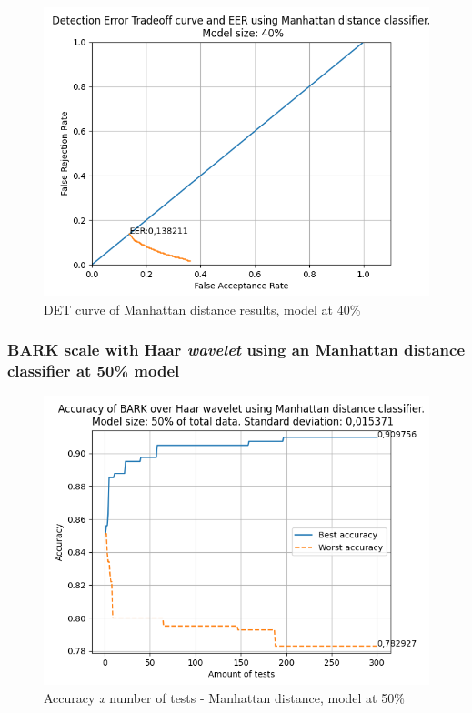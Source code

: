 			\begin{figure}[H]
				\centering
				\includegraphics[scale=.6]{images/results/det/DET_for_classifier_Manhattan_40}
				\caption{DET curve of Manhattan distance results, model at 40\%}
				\label{fig:detforclassifiermanhattan40}
			\end{figure}
		
			
		
		\subsubsection{BARK scale with Haar \textit{wavelet} using an Manhattan distance classifier at 50\% model}
			
			\begin{figure}[H]
				\centering
				\includegraphics[scale=.6]{images/results/confusionMatrices/classifier_Manhattan_50.png}
				\caption{Accuracy \textit{x} number of tests - Manhattan distance, model at 50\%}
				\label{fig:classifiermanhattan50}
			\end{figure}
			
